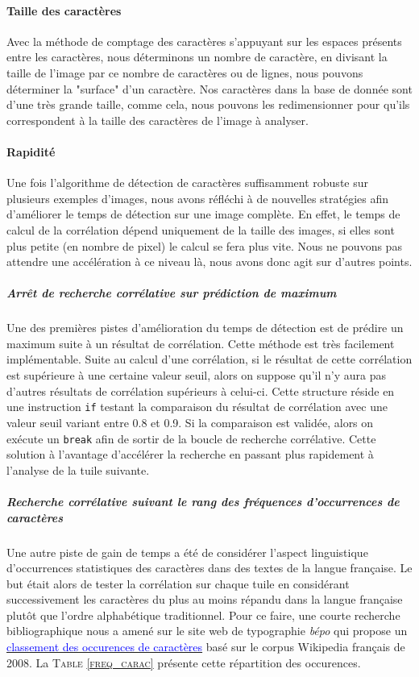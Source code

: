 \documentclass[a4paper,12pt,titlepage]{report}
\begin{document}
	\paragraph{Taille des caractères}
	Avec la méthode de comptage des caractères s'appuyant sur les espaces présents entre les caractères, nous déterminons un nombre de caractère, en divisant la taille de l'image par ce nombre de caractères ou de lignes, nous pouvons déterminer la "surface" d'un caractère. Nos caractères dans la base de donnée sont d'une très grande taille, comme cela, nous pouvons les redimensionner pour qu'ils correspondent à la taille des caractères de l'image à analyser.
	\paragraph{Rapidité}
	Une fois l'algorithme de détection de caractères suffisamment robuste sur plusieurs exemples d'images, nous avons réfléchi à de nouvelles stratégies afin d'améliorer le temps de détection sur une image complète.
	En effet, le temps de calcul de la corrélation dépend uniquement de la taille des images, si elles sont plus petite (en nombre de pixel) le calcul se fera plus vite. Nous ne pouvons pas attendre une accélération à ce niveau là, nous avons donc agit sur d'autres points.
	\subparagraph{Arrêt de recherche corrélative sur prédiction de maximum}
	\label{stop_cor}
	Une des premières pistes d'amélioration du temps de détection est de prédire un maximum suite à un résultat de corrélation. Cette méthode est très facilement implémentable. Suite au calcul d'une corrélation, si le résultat de cette corrélation est supérieure à une certaine valeur seuil, alors on suppose qu'il n'y aura pas d'autres résultats de corrélation supérieurs à celui-ci. Cette structure réside en une instruction \texttt{if} testant la comparaison du résultat de corrélation avec une valeur seuil variant entre 0.8 et 0.9. Si la comparaison est validée, alors on exécute un \texttt{break} afin de sortir de la boucle de recherche corrélative. Cette solution à l'avantage d'accélérer la recherche en passant plus rapidement à l'analyse de la tuile suivante.
	
	\subparagraph{Recherche corrélative suivant le rang des fréquences d’occurrences de caractères}	 
	 Une autre piste de gain de temps a été de considérer l'aspect linguistique d’occurrences statistiques des caractères dans des textes de la langue française. Le but était alors de tester la corrélation sur chaque tuile en considérant successivement les caractères du plus au moins répandu dans la langue française plutôt que l'ordre alphabétique traditionnel. Pour ce faire, une courte recherche bibliographique nous a amené sur le site web de typographie \textit{bépo} qui propose un \href{http://bepo.fr/wiki/Fr%C3%A9quence_des_caract%C3%A8res}{\textcolor{blue}{classement des occurences de caractères}} basé sur le corpus Wikipedia français de 2008. La \textsc{Table \ref{freq_carac}} présente cette répartition des occurences. 
	 
\end{document}
